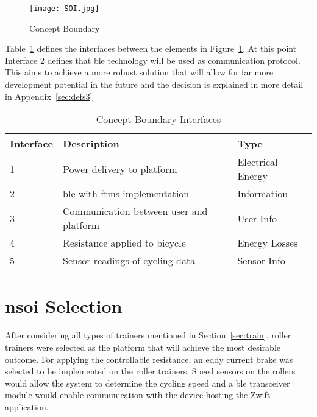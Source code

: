 \begin{figure}[H]
	\begin{center}
		\texttt{[image: SOI.jpg]}
		\caption{Concept Boundary}
		\label{fig:soi}
	\end{center}
\end{figure}

Table~\ref{tab:links} defines the interfaces between the elements in Figure~\ref{fig:soi}. At this point Interface 2 defines that \ac{ble} technology will be used as communication protocol. This aims to achieve a more robust solution that will allow for far more development potential in the future and the decision is explained in more detail in Appendix~\ref{sec:defs3}

\begin{table}[H]
	\renewcommand{\arraystretch}{\tablestretch}
	\centering
	\caption{Concept Boundary Interfaces}
	\begin{tabularx}{\textwidth}{p{1.5cm} X p{3.5cm}}
		\toprule
		Interface & Description                             & Type              \\
		\midrule
		1         & Power delivery to platform              & Electrical Energy \\
		2         & \ac{ble} with \ac{ftms} implementation  & Information       \\
		3         & Communication between user and platform & User Info         \\
		4         & Resistance applied to bicycle           & Energy Losses     \\
		5         & Sensor readings of cycling data         & Sensor Info       \\
		\bottomrule
	\end{tabularx}
	\label{tab:links}
\end{table}

\section{\ac{nsoi} Selection}

After considering all types of trainers mentioned in Section~\ref{sec:train}, roller trainers were selected as the platform that will achieve the most desirable outcome. For applying the controllable resistance, an eddy current brake was selected to be implemented on the roller trainers. Speed sensors on the rollers would allow the system to determine the cycling speed and a \ac{ble} transceiver module would enable communication with the device hosting the Zwift application.


